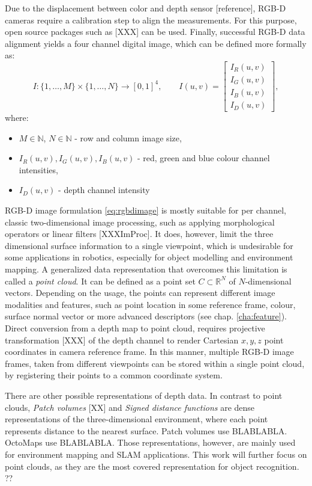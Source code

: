 Due to the displacement between color and depth sensor [reference], RGB-D cameras require a calibration step to align the measurements. For this purpose, open source packages such as [XXX] can be used. Finally, successful RGB-D data alignment yields a four channel digital image, which can be defined more formally as:
\begin{equation}
\label{eq:rgbdimage}
I: \{1,\dots,M\} \times \{1,\dots,N\} \rightarrow [0,1]^4,\qquad I(u,v) =  \begin{bmatrix} I_R(u,v) \\ I_G(u,v) \\ I_B(u,v) \\ I_D(u,v) \end{bmatrix},
\end{equation}
where:
\begin{itemize}
\item $M \in \mathbb{N}$, $N \in \mathbb{N}$ - row and column image size,
\item $I_R(u,v), I_G(u,v), I_B(u,v)$ - red, green and blue colour channel intensities,
\item $I_D(u,v)$ - depth channel intensity
\end{itemize}

RGB-D image formulation \ref{eq:rgbdimage} is mostly suitable for per channel, classic two-dimensional image processing, such as applying morphological operators or linear filters [XXXImProc]. It does, however, limit the three dimensional surface information to a single viewpoint, which is undesirable for some applications in robotics, especially for object modelling and environment mapping. A generalized data representation that overcomes this limitation is called a \textit{point cloud}. It can be defined as a point set $C \subset \mathbb{R}^N$ of $N$-dimensional vectors. Depending on the usage, the points can represent different image modalities and features, such as point location in some reference frame, colour, surface normal vector or more advanced descriptors (see chap. \ref{cha:feature}). Direct conversion from a depth map to point cloud, requires projective transformation [XXX] of the depth channel to render Cartesian $x,y,z$ point coordinates in camera reference frame. In this manner, multiple RGB-D image frames, taken from different viewpoints can be stored within a single point cloud, by registering their points to a common coordinate system.

There are other possible representations of depth data. In contrast to point clouds, \textit{Patch volumes} [XX] and \textit{Signed distance functions} are dense representations of the three-dimensional environment, where each point represents distance to the nearest surface. Patch volumes use BLABLABLA. OctoMaps use BLABLABLA. Those representations, however, are mainly used for environment mapping and SLAM applications. This work will further focus on point clouds, as they are the most covered representation for object recognition. ??

